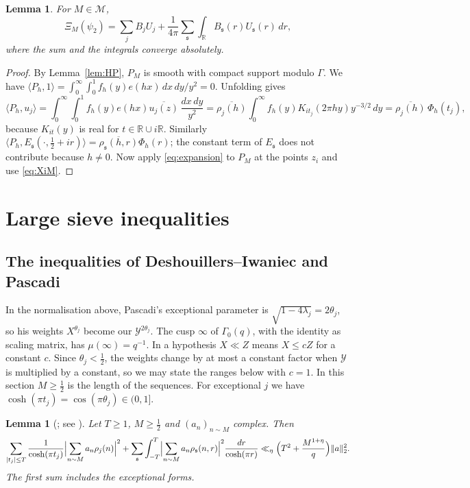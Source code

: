 \documentclass[11pt]{amsart}
\newtheorem{lemma}[theorem]{Lemma}
\theoremstyle{remark}
\theoremstyle{definition}
\numberwithin{equation}{section}
\newcommand{\Mset}{\mathcal{M}}
\newcommand{\R}{\mathbb{R}}
\newcommand{\gs}{\mathfrak{s}}
\newcommand{\br}[1]{\langle #1\rangle}
\begin{document}
\begin{lemma}\label{lem:expansion}
For $M\in\Mset$,
\[
\Xi_M(\psi_2)=\sum_jB_jU_j+\frac1{4\pi}\sum_\gs\int_\R B_\gs(r)U_\gs(r)\,dr,
\]
where the sum and the integrals converge absolutely.
\end{lemma}

\begin{proof}
By Lemma~\ref{lem:HP}, $P_M$ is smooth with compact support modulo $\Gamma$. We have $\br{P_h,1}=\int_0^\infty\int_0^1f_h(y)e(hx)\,dx\,dy/y^2=0$. Unfolding gives
\[
\br{P_h,u_j}=\int_0^\infty\int_0^1f_h(y)e(hx)\overline{u_j(z)}\,\frac{dx\,dy}{y^2}=\overline{\rho_j(h)}\int_0^\infty f_h(y)K_{it_j}(2\pi hy)y^{-3/2}\,dy=\overline{\rho_j(h)}\,\Phi_h(t_j),
\]
because $K_{it}(y)$ is real for $t\in\R\cup i\R$. Similarly $\br{P_h,E_\gs(\cdot,\frac12+ir)}=\overline{\rho_\gs(h,r)}\Phi_h(r)$; the constant term of $E_\gs$ does not contribute because $h\ne0$. Now apply \eqref{eq:expansion} to $P_M$ at the points $z_i$ and use \eqref{eq:XiM}.
\end{proof}

\section{Large sieve inequalities}\label{sec:largesieve}

\subsection{The inequalities of Deshouillers--Iwaniec and Pascadi}
In the normalisation above, Pascadi's exceptional parameter is $\sqrt{1-4\lambda_j}=2\theta_j$, so his weights $X^{\theta_j}$ become our $\mathcal Y^{2\theta_j}$. The cusp $\infty$ of $\Gamma_0(q)$, with the identity as scaling matrix, has $\mu(\infty)=q^{-1}$. In \cite{Pas} a hypothesis $X\ll Z$ means $X\le cZ$ for a constant $c$. Since $\theta_j<\frac12$, the weights change by at most a constant factor when $\mathcal Y$ is multiplied by a constant, so we may state the ranges below with $c=1$. In this section $M\ge\frac12$ is the length of the sequences. For exceptional $j$ we have $\cosh(\pi t_j)=\cos(\pi\theta_j)\in(0,1]$.

\begin{lemma}[{\cite[Theorem~2]{DI}; see \cite[Lemma~H]{Pas}}]\label{lem:DI2}
Let $T\ge1$, $M\ge\frac12$ and $(a_n)_{n\sim M}$ complex. Then
\[
\sum_{|t_j|\le T}\frac{1}{\cosh(\pi t_j)}\Bigl|\sum_{n\sim M}a_n\rho_j(n)\Bigr|^2+\sum_\gs\int_{-T}^T\Bigl|\sum_{n\sim M}a_n\rho_\gs(n,r)\Bigr|^2\frac{dr}{\cosh(\pi r)}\ll_\eta\Bigl(T^2+\frac{M^{1+\eta}}q\Bigr)\|a\|_2^2.
\]
The first sum includes the exceptional forms.
\end{lemma}
\end{document}
